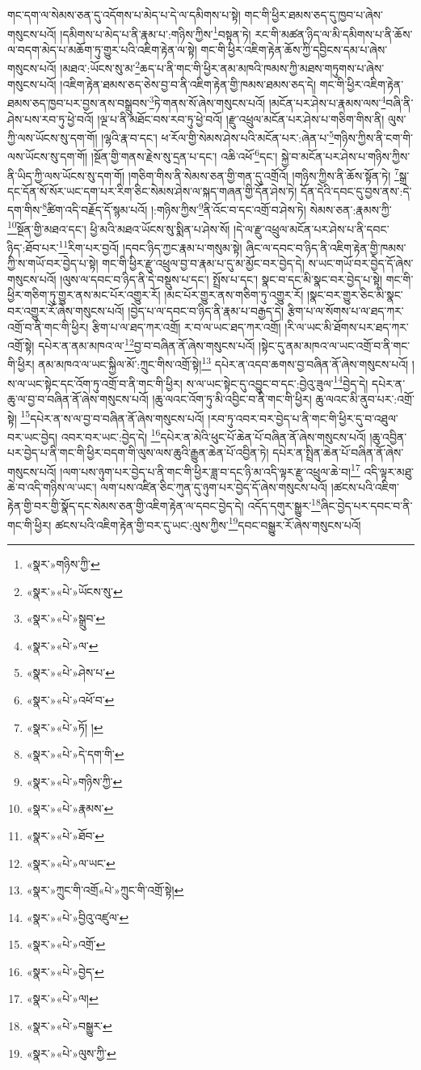 གང་དག་ལ་སེམས་ཅན་དུ་འདོགས་པ་མེད་པ་དེ་ལ་དམིགས་པ་སྟེ། གང་གི་ཕྱིར་ཐམས་ཅད་དུ་ཁྱབ་པ་ཞེས་གསུངས་པའོ། །དམིགས་པ་མེད་པ་ནི་རྣམ་པ་:གཉིས་ཀྱིས་\footnote{«སྣར་»གཉིས་ཀྱི་}བསྟན་ཏེ། རང་གི་མཚན་ཉིད་ལ་མི་དམིགས་པ་ནི་ཆོས་ལ་བདག་མེད་པ་མཆོག་ཏུ་གྱུར་པའི་འཇིག་རྟེན་ལ་སྟེ། གང་གི་ཕྱིར་འཇིག་རྟེན་ཆོས་ཀྱི་དབྱིངས་དམ་པ་ཞེས་གསུངས་པའོ། །མཐའ་:ཡོངས་སུ་མ་\footnote{«སྣར་»«པེ་»ཡོངས་སུ་}ཆད་པ་ནི་གང་གི་ཕྱིར་ནམ་མཁའི་ཁམས་ཀྱི་མཐས་གཏུགས་པ་ཞེས་གསུངས་པའོ། །འཇིག་རྟེན་ཐམས་ཅད་ཅེས་བྱ་བ་ནི་འཇིག་རྟེན་གྱི་ཁམས་ཐམས་ཅད་དེ། གང་གི་ཕྱིར་འཇིག་རྟེན་ཐམས་ཅད་ཁྱབ་པར་བྱས་ནས་བསྒྲུབས་\footnote{«སྣར་»«པེ་»སྒྲུབ་}ཏེ་གནས་སོ་ཞེས་གསུངས་པའོ། །མངོན་པར་ཤེས་པ་རྣམས་ལས་\footnote{«སྣར་»«པེ་»ལ་}བཞི་ནི་ཤེས་པས་རབ་ཏུ་ཕྱེ་བའོ། །ལྔ་པ་ནི་མཐོང་བས་རབ་ཏུ་ཕྱེ་བའོ། །རྫུ་འཕྲུལ་མངོན་པར་ཤེས་པ་གཅིག་གིས་ནི། ལུས་ཀྱི་ལས་ཡོངས་སུ་དག་གོ། །ལྷའི་རྣ་བ་དང་། ཕ་རོལ་གྱི་སེམས་ཤེས་པའི་མངོན་པར་:ཞེན་པ་\footnote{«སྣར་»«པེ་»ཤེས་པ་}གཉིས་ཀྱིས་ནི་ངག་གི་ལས་ཡོངས་སུ་དག་གོ། །སྔོན་གྱི་གནས་རྗེས་སུ་དྲན་པ་དང་། འཆི་འཕོ་\footnote{«སྣར་»«པེ་»འཕོ་བ་}དང་། སྐྱེ་བ་མངོན་པར་ཤེས་པ་གཉིས་ཀྱིས་ནི་ཡིད་ཀྱི་ལས་ཡོངས་སུ་དག་གོ། །གཅིག་གིས་ནི་སེམས་ཅན་གྱི་གན་དུ་འགྲོའོ། །གཉིས་ཀྱིས་ནི་ཆོས་སྟོན་ཏེ། \footnote{«སྣར་»«པེ་»ཏོ། ། }སྒྲ་དང་དོན་སོ་སོར་ཡང་དག་པར་རིག་ཅིང་སེམས་ཤེས་ལ་སྐད་གཞན་གྱི་དོན་ཤེས་ཏེ། དོན་དེའི་དབང་དུ་བྱས་ནས་:དེ་དག་གིས་\footnote{«སྣར་»«པེ་»དེ་དག་གི་}ཚིག་འདི་བརྗོད་དོ་སྙམ་པའོ། །:གཉིས་ཀྱིས་\footnote{«སྣར་»«པེ་»གཉིས་ཀྱི་}ནི་འོང་བ་དང་འགྲོ་བ་ཤེས་ཏེ། སེམས་ཅན་:རྣམས་ཀྱི་\footnote{«སྣར་»«པེ་»རྣམས་}སྔོན་གྱི་མཐའ་དང་། ཕྱི་མའི་མཐའ་ཡོངས་སུ་སྨིན་པ་ཤེས་སོ། །དེ་ལ་རྫུ་འཕྲུལ་མངོན་པར་ཤེས་པ་ནི་དབང་ཉིད་:ཐོབ་པར་\footnote{«སྣར་»«པེ་»ཐོབ་}རིག་པར་བྱའོ། །དབང་ཉིད་ཀྱང་རྣམ་པ་གསུམ་སྟེ། ཞིང་ལ་དབང་བ་ཉིད་ནི་འཇིག་རྟེན་གྱི་ཁམས་ཀྱི་ས་གཡོ་བར་བྱེད་པ་སྟེ། གང་གི་ཕྱིར་རྫུ་འཕྲུལ་བྱ་བ་རྣམ་པ་དུ་མ་མྱོང་བར་བྱེད་དེ། ས་ཡང་གཡོ་བར་བྱེད་དོ་ཞེས་གསུངས་པའོ། །ལུས་ལ་དབང་བ་ཉིད་ནི་དེ་བསྡུས་པ་དང་། སྤྲོས་པ་དང་། སྣང་བ་དང་མི་སྣང་བར་བྱེད་པ་སྟེ། གང་གི་ཕྱིར་གཅིག་ཏུ་གྱུར་ནས་མང་པོར་འགྱུར་རོ། །མང་པོར་གྱུར་ནས་གཅིག་ཏུ་འགྱུར་རོ། །སྣང་བར་གྱུར་ཅིང་མི་སྣང་བར་འགྱུར་རོ་ཞེས་གསུངས་པའོ། །བྱེད་པ་ལ་དབང་བ་ཉིད་ནི་རྣམ་པ་བརྒྱད་དེ། རྩིག་པ་ལ་སོགས་པ་ལ་ཐད་ཀར་འགྲོ་བ་ནི་གང་གི་ཕྱིར། རྩིག་པ་ལ་ཐད་ཀར་འགྲོ། ར་བ་ལ་ཡང་ཐད་ཀར་འགྲོ། །རི་ལ་ཡང་མི་ཐོགས་པར་ཐད་ཀར་འགྲོ་སྟེ། དཔེར་ན་ནམ་མཁའ་ལ་\footnote{«སྣར་»«པེ་»ལ་ཡང་}བྱ་བ་བཞིན་ནོ་ཞེས་གསུངས་པའོ། །སྟེང་དུ་ནམ་མཁའ་ལ་ཡང་འགྲོ་བ་ནི་གང་གི་ཕྱིར། ནམ་མཁའ་ལ་ཡང་སྐྱིལ་མོ་:ཀྲུང་གིས་འགྲོ་སྟེ།\footnote{«སྣར་»ཀྲུང་གི་འགྲོ«པེ་»ཀྲུང་གི་འགྲོ་སྟེ།} དཔེར་ན་འདབ་ཆགས་བྱ་བཞིན་ནོ་ཞེས་གསུངས་པའོ། །ས་ལ་ཡང་སྟེང་དང་འོག་ཏུ་འགྲོ་བ་ནི་གང་གི་ཕྱིར། ས་ལ་ཡང་སྟེང་དུ་འབྱུང་བ་དང་:བྱེའུ་ཟུལ་\footnote{«སྣར་»«པེ་»བྱིའུ་འཛུལ་}བྱེད་དེ། དཔེར་ན་ཆུ་ལ་བྱ་བ་བཞིན་ནོ་ཞེས་གསུངས་པའོ། །ཆུ་ལའང་འོག་ཏུ་མི་འབྱིང་བ་ནི་གང་གི་ཕྱིར། ཆུ་ལའང་མི་ནུབ་པར་:འགྲོ་སྟེ། \footnote{«སྣར་»«པེ་»འགྲོ་}དཔེར་ན་ས་ལ་བྱ་བ་བཞིན་ནོ་ཞེས་གསུངས་པའོ། །རབ་ཏུ་འབར་བར་བྱེད་པ་ནི་གང་གི་ཕྱིར་དུ་བ་འཐུལ་བར་ཡང་བྱེད། འབར་བར་ཡང་:བྱེད་དེ། \footnote{«སྣར་»«པེ་»བྱེད་}དཔེར་ན་མེའི་ཕུང་པོ་ཆེན་པོ་བཞིན་ནོ་ཞེས་གསུངས་པའོ། །ཆུ་འབྱིན་པར་བྱེད་པ་ནི་གང་གི་ཕྱིར་བདག་གི་ལུས་ལས་ཆུའི་རྒྱུན་ཆེན་པོ་འབྱིན་ཏེ། དཔེར་ན་སྤྲིན་ཆེན་པོ་བཞིན་ནོ་ཞེས་གསུངས་པའོ། །ལག་པས་ཉུག་པར་བྱེད་པ་ནི་གང་གི་ཕྱིར་ཟླ་བ་དང་ཉི་མ་འདི་ལྟར་རྫུ་འཕྲུལ་ཆེ་བ།\footnote{«སྣར་»«པེ་»ལ།} འདི་ལྟར་མཐུ་ཆེ་བ་འདི་གཉིས་ལ་ཡང་། ལག་པས་འཛིན་ཅིང་ཀུན་དུ་ཉུག་པར་བྱེད་དོ་ཞེས་གསུངས་པའོ། །ཚངས་པའི་འཇིག་རྟེན་གྱི་བར་གྱི་སྣོད་དང་སེམས་ཅན་གྱི་འཇིག་རྟེན་ལ་དབང་བྱེད་དེ། འདོད་དགུར་སྒྱུར་\footnote{«སྣར་»«པེ་»བསྒྱུར་}ཞིང་བྱེད་པར་དབང་བ་ནི་གང་གི་ཕྱིར། ཚངས་པའི་འཇིག་རྟེན་གྱི་བར་དུ་ཡང་:ལུས་ཀྱིས་\footnote{«སྣར་»«པེ་»ལུས་ཀྱི་}དབང་བསྒྱུར་རོ་ཞེས་གསུངས་པའོ། 